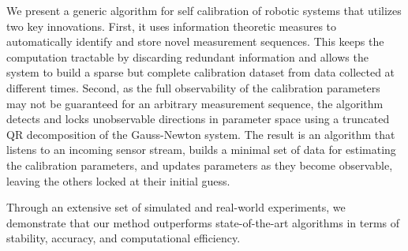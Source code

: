 We present a generic algorithm for self calibration of robotic systems
that utilizes two key innovations. First, it uses information
theoretic measures to automatically identify and store novel
measurement sequences. This keeps the computation tractable by
discarding redundant information and allows the system to build a
sparse but complete calibration dataset from data collected at
different times. Second, as the full observability of the calibration
parameters may not be guaranteed for an arbitrary measurement
sequence, the algorithm detects and locks unobservable directions in
parameter space using a truncated QR decomposition of the Gauss-Newton
system. The result is an algorithm that listens to an incoming
sensor stream, builds a minimal set of data for estimating the
calibration parameters, and updates parameters as they become
observable, leaving the others locked at their initial guess.

Through an extensive set of simulated and real-world experiments, we
demonstrate that our method outperforms state-of-the-art algorithms in
terms of stability, accuracy, and computational efficiency.
